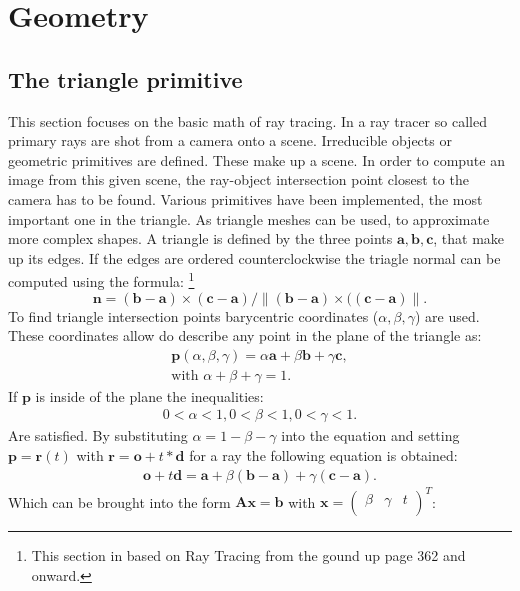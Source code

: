 \section{Geometry}
\subsection{The triangle primitive}
This section focuses on the basic math of ray tracing. In a ray tracer so called primary rays are shot from a camera
onto a scene. Irreducible objects or geometric primitives are defined. These make up a scene. In order to compute an
image from this given scene, the ray-object intersection point closest to the camera has to be found. 
Various primitives have been implemented, the most important one in the triangle. As triangle meshes can be used, to
approximate more complex shapes. A triangle is defined by the three points $\mathbf{a},\mathbf{b},\mathbf{c}$, that make up its edges. If the edges are ordered counterclockwise the triagle normal can be computed using the formula:
\footnote{This section in based on Ray Tracing from the gound up page 362 and onward.}
\begin{equation}
\mathbf{n} = (\mathbf{b} - \mathbf{a}) \times (\mathbf{c} - \mathbf{a}) /
 \|( \mathbf{b} - \mathbf{a} ) \times ((\mathbf{c} - \mathbf{a})\|.
\end{equation}
To find triangle intersection points barycentric coordinates ($\alpha, \beta, \gamma$) are used. These coordinates allow do describe any point in the plane of the triangle as:
\begin{align}
\mathbf{p}(\alpha,\beta,\gamma) = \alpha \mathbf{a} + \beta \mathbf{b} + \gamma \mathbf{c}, \\
\text{with } \alpha + \beta + \gamma = 1.
\end{align}
If $\mathbf{p}$ is inside of the plane the inequalities:
\begin{align}
0 < \alpha < 1,
0 < \beta < 1,
0 < \gamma < 1.
\label{ineq:inCond}
\end{align}
Are satisfied. By substituting $\alpha = 1 - \beta - \gamma$ into the equation and setting $\mathbf{p} = \mathbf{r}(t)$ with $\mathbf{r} = \mathbf{o} + t * \mathbf{d}$ for a ray the following equation is obtained:
\begin{align}
\mathbf{o} + t\mathbf{d} = \mathbf{a} + \beta(\mathbf{b} - \mathbf{a}) + \gamma (\mathbf{c} - \mathbf{a}).
\end{align}
Which can be brought into the form $\mathbf{A}\mathbf{x} = \mathbf{b}$ with $\mathbf{x} = \begin{pmatrix}
\beta & \gamma & t \\
\end{pmatrix}^T$:
